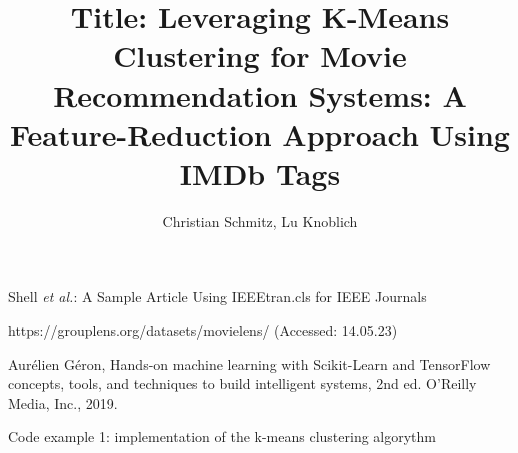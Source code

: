 \documentclass[lettersize,journal]{IEEEtran}
\begin{document}
\title{Title: Leveraging K-Means Clustering for Movie Recommendation Systems: A Feature-Reduction Approach Using IMDb Tags}

\author{Christian Schmitz, Lu Knoblich}

%
{Shell \MakeLowercase{\textit{et al.}}: A Sample Article Using IEEEtran.cls for IEEE Journals}

\maketitle









\clearpage
\begin{thebibliography}{1}

https://grouplens.org/datasets/movielens/ (Accessed: 14.05.23)

Aurélien Géron, Hands-on machine learning with Scikit-Learn and TensorFlow concepts, tools, and techniques to build intelligent systems, 2nd ed. O’Reilly Media, Inc., 2019.
‌

\end{thebibliography}

\vfill
\clearpage
\newpage
\appendix

\label{appendix:code1}Code example 1: implementation of the k-means clustering algorythm
\end{document}
